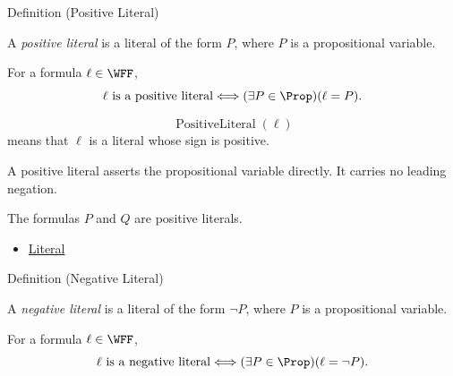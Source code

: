 \begin{definitionbox}{Definition (Positive Literal)}
\begin{definition}
\label{def:positive-literal-propositional-logic}
A \emph{positive literal} is a literal of the form \(P\), where \(P\) is a
propositional variable.
\end{definition}
\end{definitionbox}

\begin{remark*}
For a formula \(\ell\in\WFF\),
\[
\ell\text{ is a positive literal}
\Longleftrightarrow
(\exists P\in\Prop)(\ell=P).
\]
\end{remark*}

\begin{remark*}
\[
\operatorname{PositiveLiteral}(\ell)
\]
means that \(\ell\) is a literal whose sign is positive.
\end{remark*}

\begin{remark*}[Interpretation]
A positive literal asserts the propositional variable directly. It carries no
leading negation.
\end{remark*}

\begin{remark*}[Examples]
The formulas \(P\) and \(Q\) are positive literals.
\end{remark*}

\begin{dependencies}
\begin{itemize}
  \item \hyperref[def:literal-propositional-logic]{Literal}
\end{itemize}
\end{dependencies}

\begin{definitionbox}{Definition (Negative Literal)}
\begin{definition}
\label{def:negative-literal-propositional-logic}
A \emph{negative literal} is a literal of the form \(\neg P\), where \(P\) is a
propositional variable.
\end{definition}
\end{definitionbox}

\begin{remark*}
For a formula \(\ell\in\WFF\),
\[
\ell\text{ is a negative literal}
\Longleftrightarrow
(\exists P\in\Prop)(\ell=\neg P).
\]
\end{remark*}

